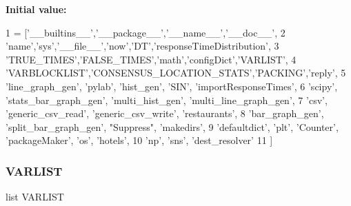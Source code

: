{\bfseries Initial value\+:}
\begin{DoxyCode}
1 =  [\textcolor{stringliteral}{'\_\_builtins\_\_'},\textcolor{stringliteral}{'\_\_package\_\_'},\textcolor{stringliteral}{'\_\_name\_\_'},\textcolor{stringliteral}{'\_\_doc\_\_'},
2                 \textcolor{stringliteral}{'name'},\textcolor{stringliteral}{'sys'},\textcolor{stringliteral}{'\_\_file\_\_'},\textcolor{stringliteral}{'now'},\textcolor{stringliteral}{'DT'},\textcolor{stringliteral}{'responseTimeDistribution'},
3                 \textcolor{stringliteral}{'TRUE\_TIMES'},\textcolor{stringliteral}{'FALSE\_TIMES'},\textcolor{stringliteral}{'math'},\textcolor{stringliteral}{'configDict'},\textcolor{stringliteral}{'VARLIST'},
4                 \textcolor{stringliteral}{'VARBLOCKLIST'},\textcolor{stringliteral}{'CONSENSUS\_LOCATION\_STATS'},\textcolor{stringliteral}{'PACKING'},\textcolor{stringliteral}{'reply'},
5                 \textcolor{stringliteral}{'line\_graph\_gen'}, \textcolor{stringliteral}{'pylab'}, \textcolor{stringliteral}{'hist\_gen'}, \textcolor{stringliteral}{'SIN'}, \textcolor{stringliteral}{'importResponseTimes'},
6                 \textcolor{stringliteral}{'scipy'}, \textcolor{stringliteral}{'stats\_bar\_graph\_gen'}, \textcolor{stringliteral}{'multi\_hist\_gen'}, \textcolor{stringliteral}{'multi\_line\_graph\_gen'},
7                 \textcolor{stringliteral}{'csv'}, \textcolor{stringliteral}{'generic\_csv\_read'}, \textcolor{stringliteral}{'generic\_csv\_write'}, \textcolor{stringliteral}{'restaurants'},
8                 \textcolor{stringliteral}{'bar\_graph\_gen'}, \textcolor{stringliteral}{'split\_bar\_graph\_gen'}, \textcolor{stringliteral}{"Suppress"}, \textcolor{stringliteral}{'makedirs'},
9                 \textcolor{stringliteral}{'defaultdict'}, \textcolor{stringliteral}{'plt'}, \textcolor{stringliteral}{'Counter'}, \textcolor{stringliteral}{'packageMaker'}, \textcolor{stringliteral}{'os'}, \textcolor{stringliteral}{'hotels'},
10                 \textcolor{stringliteral}{'np'}, \textcolor{stringliteral}{'sns'}, \textcolor{stringliteral}{'dest\_resolver'}
11                 ]
\end{DoxyCode}
\mbox{\label{namespacedynamicfilterapp_1_1toggles_abad4087652ccca08b33c499c7aad17b0}} 
\subsubsection{\texorpdfstring{V\+A\+R\+L\+I\+ST}{VARLIST}}
{\footnotesize\ttfamily list V\+A\+R\+L\+I\+ST}

